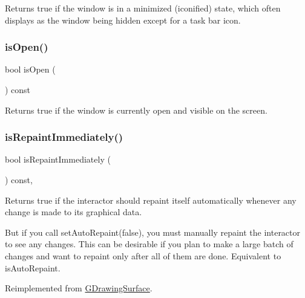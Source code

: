 Returns true if the window is in a minimized (iconified) state, which often displays as the window being hidden except for a task bar icon. 

\mbox{\label{classGWindow_a002ed331862370f434b7befe331b5a0b}} 
\subsubsection{\texorpdfstring{is\+Open()}{isOpen()}}
{\footnotesize\ttfamily bool is\+Open (\begin{DoxyParamCaption}{ }\end{DoxyParamCaption}) const\hspace{0.3cm}{\ttfamily [virtual]}}



Returns true if the window is currently open and visible on the screen. 

\mbox{\label{classGWindow_a45b1955433b8bf8a449a216b847d87f7}} 
\subsubsection{\texorpdfstring{is\+Repaint\+Immediately()}{isRepaintImmediately()}}
{\footnotesize\ttfamily bool is\+Repaint\+Immediately (\begin{DoxyParamCaption}{ }\end{DoxyParamCaption}) const\hspace{0.3cm}{\ttfamily [override]}, {\ttfamily [virtual]}}



Returns true if the interactor should repaint itself automatically whenever any change is made to its graphical data. 

But if you call set\+Auto\+Repaint(false), you must manually repaint the interactor to see any changes. This can be desirable if you plan to make a large batch of changes and want to repaint only after all of them are done. Equivalent to is\+Auto\+Repaint. 

Reimplemented from \mbox{\hyperlink{classGDrawingSurface_a82a00267c81cc0ae85ee0feb01a92fa8}{G\+Drawing\+Surface}}.

\mbox{\label{classGWindow_a2afeea3d26d063fa35c104e73275cec7}} 
